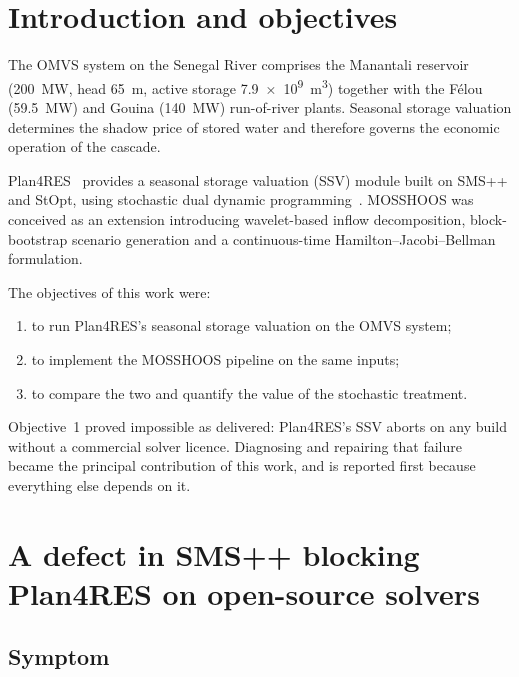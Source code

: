 \documentclass[12pt,a4paper]{article}
\begin{document}
\tableofcontents
\newpage

\section{Introduction and objectives}

The OMVS system on the Senegal River comprises the Manantali reservoir
(\SI{200}{\mega\watt}, head \SI{65}{\metre}, active storage
\SI{7.9e9}{\cubic\metre}) together with the Félou (\SI{59.5}{\mega\watt}) and
Gouina (\SI{140}{\mega\watt}) run-of-river plants. Seasonal storage valuation
determines the shadow price of stored water and therefore governs the economic
operation of the cascade.

Plan4RES~\citep{Plan4RES2024} provides a seasonal storage valuation (SSV) module
built on SMS++ and StOpt, using stochastic dual dynamic
programming~\citep{PereiraPinto1991}. MOSSHOOS was conceived as an extension
introducing wavelet-based inflow decomposition, block-bootstrap scenario
generation and a continuous-time Hamilton--Jacobi--Bellman formulation.

The objectives of this work were:
\begin{enumerate}[itemsep=2pt]
\item to run Plan4RES's seasonal storage valuation on the OMVS system;
\item to implement the MOSSHOOS pipeline on the same inputs;
\item to compare the two and quantify the value of the stochastic treatment.
\end{enumerate}

Objective~1 proved impossible as delivered: Plan4RES's SSV aborts on any build
without a commercial solver licence. Diagnosing and repairing that failure became
the principal contribution of this work, and is reported first because everything
else depends on it.

\section{A defect in SMS++ blocking Plan4RES on open-source solvers}
\label{sec:bug}

\subsection{Symptom}
\end{document}
